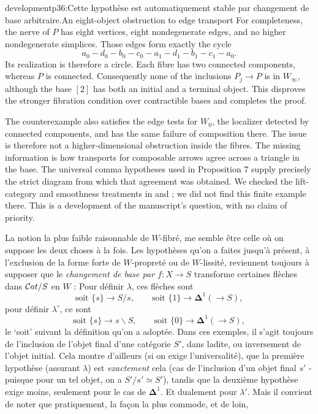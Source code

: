 \begin{dcomment}{development}{p36:Cette hypothèse est automatiquement stable par changement de base arbitraire.}{An eight-object obstruction to edge transport}
For completeness, the nerve of $P$ has eight vertices, eight nondegenerate edges, and no higher nondegenerate simplices. Those edges form exactly the cycle
\[
 a_0-d_0-b_0-c_0-a_1-d_1-b_1-c_1-a_0.
\]
Its realization is therefore a circle. Each fibre has two connected components, whereas $P$ is connected. Consequently none of the inclusions $P_j\to P$ is in $W_\infty$, although the base $[2]$ has both an initial and a terminal object. This disproves the stronger fibration condition over contractible bases and completes the proof.

The counterexample also satisfies the edge tests for $W_0$, the localizer detected by connected components, and has the same failure of composition there. The issue is therefore not a higher-dimensional obstruction inside the fibres. The missing information is how transports for composable arrows agree across a triangle in the base. The universal comma hypotheses used in Proposition 7 supply precisely the strict diagram from which that agreement was obtained. We checked the lift-category and smoothness treatments in \citet[\S4]{Maltsiniotis2005Asphericite} and \citet[\S\S1--2]{Maltsiniotis2012Exact}; we did not find this finite example there. This is a development of the manuscript's question, with no claim of priority.
\end{dcomment}


\leavevmode{}La notion la plus faible raisonnable de $W$-fibré, me semble être celle où on suppose les deux choses à la fois. Les hypothèses qu'on a faites jusqu'à présent, à l'exclusion de la forme forte de $W$-propreté ou de $W$-lissité, reviennent toujours à supposer que le \textit{changement de base par $f : X\longrightarrow S$} transforme certaines flèches dans $\mathcal{C}at/S$ en $W$ : Pour définir $\lambda$, ces flèches sont
\[
\text{soit } \{s\}\longrightarrow S/s,\qquad \text{soit } \{1\}\longrightarrow\mathbf{\Delta}^1(\longrightarrow S),
\]
pour définir $\lambda^\circ$, ce sont
\[
\text{soit } \{s\}\longrightarrow s\backslash S,\qquad \text{soit } \{0\}\longrightarrow\mathbf{\Delta}^1(\longrightarrow S),
\]
le `soit' suivant la définition qu'on a adoptée. Dans ces exemples, il s'agit toujours de l'inclusion de l'objet final d'une catégorie $S'$, dans ladite, ou inversement de l'objet initial. Cela montre d'ailleurs (si on exige l'universalité), que la première hypothèse (assurant $\lambda$) est \textit{exactement} cela (cas de l'inclusion d'un objet final $s'$ - puisque pour un tel objet, on a $S'/s'\simeq S'$), tandis que la deuxième hypothèse exige moins, seulement pour le cas de $\mathbf{\Delta}^1$. Et dualement pour $\lambda'$. Mais il convient de noter que pratiquement, la façon la plus commode, et de loin,

